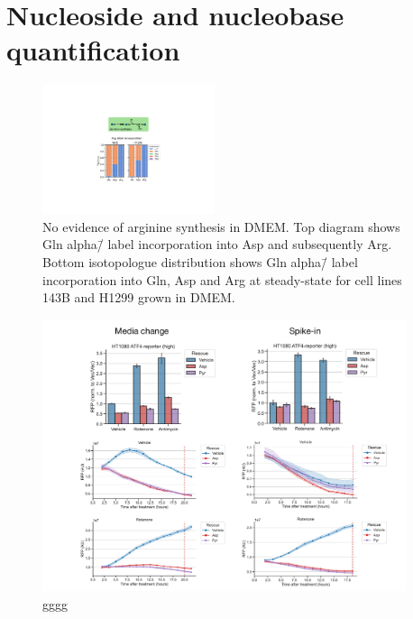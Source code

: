 \chapter{Nucleoside and nucleobase quantification}



\begin{figure}
    \centering
    \includegraphics[width=0.45\textwidth]{figures/chap2/arg_syn.pdf}
    \caption[No evidence of arginine synthesis in DMEM]{
    No evidence of arginine synthesis in DMEM.
    Top diagram shows Gln alpha\=/\hNi{} label incorporation into Asp and subsequently Arg.
    Bottom isotopologue distribution shows Gln alpha\=/\hNi{} label incorporation into Gln, Asp and Arg at steady-state for cell lines 143B and H1299 grown in DMEM.
    }
    \label{fig:ch2:asp_fate}
\end{figure}










\begin{figure}
    \centering
    \includegraphics[width=0.95\textwidth]{figures/chap2/app/atf4_chVSsp.pdf}
    \caption[APP GGGG]{
    gggg
    }
    \label{fig:app_ch2:sal_frac_conc}
\end{figure}










